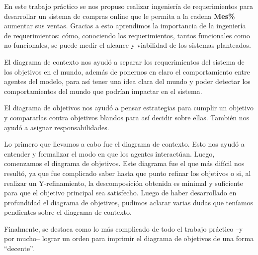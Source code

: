 En este trabajo práctico se nos propuso realizar ingeniería de requerimientos
para desarrollar un sistema de compras online que le permita a la cadena
\textbf{Mes\%} aumentar sus ventas. Gracias a esto aprendimos la importancia de
la ingeniería de requerimientos: cómo, conociendo los requerimientos, tantos
funcionales como no-funcionales, se puede medir el alcance y viabilidad de los
sistemas planteados.

El diagrama de contexto nos ayudó a separar los requerimientos del sistema de
los objetivos en el mundo, además de ponernos en claro el comportamiento entre
agentes del modelo, para así tener una idea clara del mundo y poder detectar
los comportamientos del mundo que podrían impactar en el sistema.

El diagrama de objetivos nos ayudó a pensar estrategias para cumplir un
objetivo y compararlas contra objetivos blandos para así decidir sobre ellas.
También nos ayudó a asignar responsabilidades.

Lo primero que llevamos a cabo fue el diagrama de contexto. Esto nos ayudó a
entender y formalizar el modo en que los agentes interactúan. Luego, comenzamos
el diagrama de objetivos. Este diagrama fue el que más difícil nos resultó, ya
que fue complicado saber hasta que punto refinar los objetivos o si, al
realizar un Y-refinamiento, la descomposición obtenida es minimal y suficiente
para que el objetivo principal sea satisfecho. Luego de haber desarrollado en
profundidad el diagrama de objetivos, pudimos aclarar varias dudas que teníamos
pendientes sobre el diagrama de contexto.

Finalmente, se destaca como lo más complicado de todo el trabajo práctico --y
por mucho-- lograr un orden para imprimir el diagrama de objetivos de una forma
“decente”.
